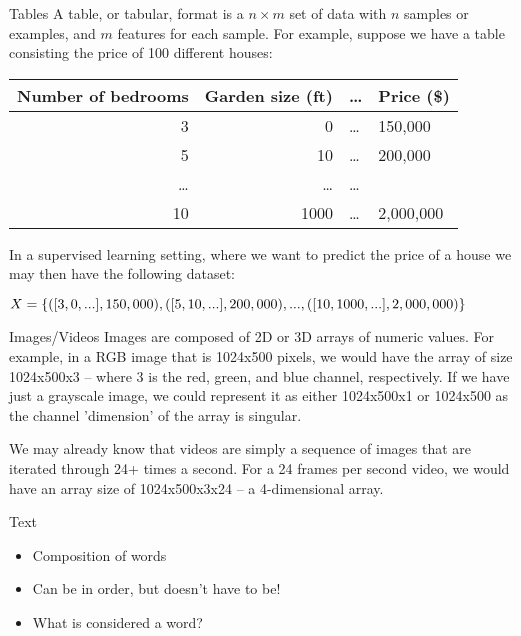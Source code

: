 \documentclass[10pt]{beamer}
\begin{document}
\begin{frame}[label={sec:org9e57e74}]{Tables}
A table, or tabular, format is a \(n \times m\) set of data with \(n\) samples or
examples, and \(m\) features for each sample. For example, suppose we have a table
consisting the price of 100 different houses:

\begin{center}
\begin{tabular}{rrll}
\toprule
Number of bedrooms & Garden size (ft) & \ldots{} & Price (\$)\\
\midrule
3 & 0 & \ldots{} & 150,000\\
5 & 10 & \ldots{} & 200,000\\
\ldots{} & \ldots{} & \ldots{} & \\
10 & 1000 & \ldots{} & 2,000,000\\
\bottomrule
\end{tabular}
\end{center}

In a supervised learning setting, where we want to predict the price of a house we may then have the following dataset:

\(X = \{([3, 0, ...], 150,000), ([5, 10, ...], 200,000), \\..., ([10, 1000, ...], 2,000,000)\}\)
\end{frame}

\begin{frame}[label={sec:org111ac3f}]{Images/Videos}
Images are composed of 2D or 3D arrays of numeric values. For example, in a RGB
image that is 1024x500 pixels, we would have the array of size 1024x500x3 -- where 3
is the red, green, and blue channel, respectively. If we have just a grayscale image,
we could represent it as either 1024x500x1 or 1024x500 as the channel 'dimension' of
the array is singular.

We may already know that videos are simply a sequence of images that are iterated
through 24+ times a second. For a 24 frames per second video, we would have an array
size of 1024x500x3x24 -- a 4-dimensional array.
\end{frame}

\begin{frame}[label={sec:org7af5e6f}]{Text}
\begin{itemize}
\item Composition of words
\item Can be in order, but doesn't have to be!
\item What is considered a word?
\end{itemize}
\end{frame}
\end{document}
